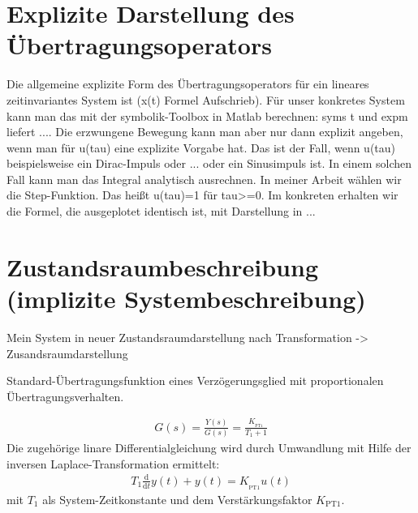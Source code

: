 \documentclass[
  ngerman
  ,12pt
  ,pdftex
]{article}
\begin{document}


\section{Explizite Darstellung des Übertragungsoperators} %
Die allgemeine explizite Form des Übertragungsoperators für ein lineares zeitinvariantes System ist (x(t) Formel Aufschrieb).
Für unser konkretes System kann man das mit der symbolik-Toolbox in Matlab berechnen: syms t und expm liefert ....
Die erzwungene Bewegung kann man aber nur dann explizit angeben, wenn man für u(tau) eine explizite Vorgabe hat. Das ist der Fall, wenn u(tau) beispielsweise ein Dirac-Impuls oder ... oder ein Sinusimpuls ist. In einem solchen Fall kann man das Integral analytisch ausrechnen. In meiner Arbeit wählen wir die Step-Funktion. Das heißt u(tau)=1 für tau>=0. Im konkreten erhalten wir die Formel, die ausgeplotet identisch ist, mit Darstellung in ...

\section{Zustandsraumbeschreibung (implizite Systembeschreibung)}
Mein System in neuer Zustandsraumdarstellung nach Transformation
-> Zusandsraumdarstellung



Standard-Übertragungsfunktion eines 
Verzögerungsglied mit proportionalen Übertragungsverhalten.

\begin{align*}
  G(s) = \frac{Y(s)}{G(s)} = \frac{K__\text{PT1}}{T_1+1}
\end{align*}
Die zugehörige linare Differentialgleichung wird durch Umwandlung mit Hilfe der inversen Laplace-Transformation ermittelt:
\begin{align*}
  T_1\frac{\mathrm d}{\mathrm dt}y(t)+y(t)=K__\text{PT1}u(t)
\end{align*}
mit $T_1$ als System-Zeitkonstante und dem Verstärkungsfaktor $K_\text{PT1}$.
\end{document}
